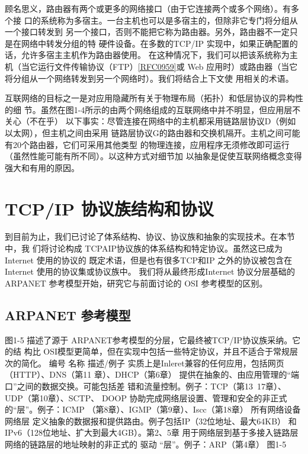 顾名思义，路由器有两个或更多的网络接口（由于它连接两个或多个网络）。有多个接
口的系统称为多宿主。一台主机也可以是多宿主的，但除非它专门将分组从一个接口转发到
另一个接口，否则不能把它称为路由器。另外，路由器不一定只是在网络中转发分组的特
硬件设备。在多数的TCP/IP 实现中，如果正确配置的话，允许多宿主主机作为路由器使用。
在这种情况下，我们可以把该系统称为主机（当它运行文件传输协议（FTP）\href{https://www.rfc-editor.org/rfc/rfc0959}{[RFC0959]}或
Web 应用时）或路由器（当它将分组从一个网络转发到另一个网络时）。我们将结合上下文使
用相关的术语。

互联网络的目标之一是对应用隐藏所有关于物理布局（拓扑）和低层协议的异构性的细
节。虽然在图1-4所示的由两个网络组成的互联网络中并不明显，但应用层不关心（不在乎）
以下事实：尽管连接在网络中的主机都采用链路层协议D（例如以太网），但主机之间由采用
链路层协议G的路由器和交换机隔开。主机之间可能有20个路由器，它们可采用其他类型
的物理连接，应用程序无须修改即可运行（虽然性能可能有所不同）。以这种方式对细节加
以抽象是促使互联网络概念变得强大和有用的原因。

\section{TCP/IP 协议族结构和协议}
到目前为止，我们已讨论了体系结构、协议、协议族和抽象的实现技术。在本节中，我
们将讨论构成 TCPAIP协议族的体系结构和特定协议。虽然这已成为 Internet 使用的协议的
既定术语，但是也有很多TCP和IP 之外的协议被包含在Internet 使用的协议集或协议族中。
我们将从最终形成Internet 协议分层基础的ARPANET 参考模型开始，研究它与前面讨论的
OSI 参考模型的区别。

\subsection{ARPANET 参考模型}

图1-5 描述了源于 ARPANET参考模型的分层，它最终被TCP/IP协议族采纳。它的结
构比 OSI模型更简单，但在实现中包括一些特定协议，并且不适合于常规层次的简化。
编号
名称
描述/例子
实质上是Inleret兼容的任何应用，包括网页（HTTP）、DNS（第11
章）、DHCP（第6章）
提供在抽象的、由应用管理的“端口”之间的数据交换。可能包括差
错和流量控制。例子：TCP（第13~17章）、UDP（第10章）、SCTP、
DOOP
协助完成网络层设置、管理和安全的非正式的“层”。例子：ICMP
（第8章）、IGMP（第9章）、Iscc（第18章）
所有网络设备
网络层
定义抽象的数据报和提供路由。例子包括IP（32位地址、最大64KB）
和IPv6（128位地址、扩大到最大4GB）。第2、5章
用于网络层到基于多接入链路层网络的链路层的地址映射的非正式的
驱动
“层”。例子：ARP（第4章）
图1-5

